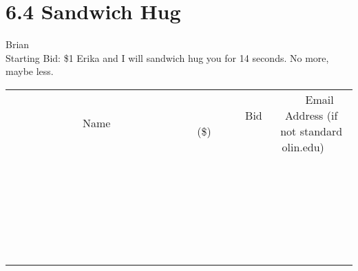 \documentclass[11pt]{article}
\begin{document}
\section*{6.4 Sandwich Hug}
Brian
\\
Starting Bid: \$1
\newline
Erika and I will sandwich hug you for 14 seconds. No more, maybe less.
\\[6ex]
\begin{tabular}{c c c}
~~~~~~~~~~~~~Name~~~~~~~~~~~~~ & ~~~~~~~~~Bid (\$)~~~~~~~~~  & ~~~Email Address (if not standard olin.edu)~~~\\
 & & \\
\hline
 & & \\
\hline
 & & \\
\hline
 & & \\
\hline
 & & \\
\hline
 & & \\
\hline
 & & \\
\hline
 & & \\
\hline
 & & \\
\hline
 & & \\
\hline
 & & \\
\hline
 & & \\
\hline
 & & \\
\hline
 & & \\
\hline
 & & \\
\hline
 & & \\
\hline
 & & \\
\hline
 & & \\
\hline
 & & \\
\hline
 & & \\
\hline
 & & \\
\hline
 & & \\
\hline
 & & \\
\hline
 & & \\
\hline
 & & \\
\hline
 & & \\
\hline
\end{tabular}
\newpage
\end{document}
